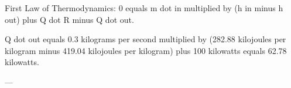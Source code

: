 First Law of Thermodynamics:  
0 equals m dot in multiplied by (h in minus h out) plus Q dot R minus Q dot out.  

Q dot out equals 0.3 kilograms per second multiplied by (282.88 kilojoules per kilogram minus 419.04 kilojoules per kilogram) plus 100 kilowatts equals 62.78 kilowatts.  

---